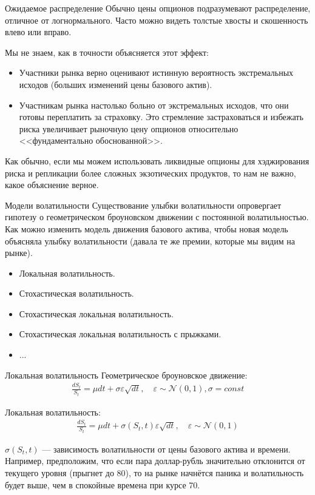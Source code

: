 \documentclass{beamer}
\begin{document}
\begin{frame}{Ожидаемое распределение}
\justify
Обычно цены опционов подразумевают распределение, отличное от логнормального. Часто можно видеть толстые хвосты и скошенность влево или вправо.

\justify
Мы не знаем, как в точности объясняется этот эффект:
\begin{itemize}
\item Участники рынка верно оценивают истинную вероятность экстремальных исходов (больших изменений цены базового актив).
\item Участникам рынка настолько больно от экстремальных исходов, что они готовы переплатить за страховку. Это стремление застраховаться и избежать риска увеличивает рыночную цену опционов относительно <<фундаментально обоснованной>>.
\end{itemize}

\justify
Как обычно, если мы можем использовать ликвидные опционы для хэджирования риска и репликации более сложных экзотических продуктов, то нам не важно, какое объяснение верное.
\end{frame}



\begin{frame}{Модели волатильности}
\justify
Существование улыбки волатильности опровергает гипотезу о геометрическом броуновском движении с постоянной волатильностью. Как можно изменить модель движения базового актива, чтобы новая модель объясняла улыбку волатильности (давала те же премии, которые мы видим на рынке).

\justify
\begin{itemize}
\item Локальная волатильность.
\item Стохастическая волатильность.
\item Стохастическая локальная волатильность.
\item Стохастическая локальная волатильность с прыжками.
\item ...
\end{itemize}
\end{frame}



\begin{frame}{Локальная волатильность}
\justify
Геометрическое броуновское движение:
\begin{align*}
\frac{dS_t}{S_t} = \mu dt + \sigma\varepsilon\sqrt{dt}, \quad \varepsilon \sim \mathcal{N}(0, 1), \sigma = const
\end{align*}

\justify
Локальная волатильность:
\begin{align*}
\frac{dS_t}{S_t} = \mu dt + \sigma(S_t, t)\varepsilon\sqrt{dt}, \quad \varepsilon \sim \mathcal{N}(0, 1)
\end{align*}

\justify
$\sigma(S_t, t)$ --- зависимость волатильности от цены базового актива и времени. Например, предположим, что если пара доллар-рубль значительно отклонится от текущего уровня (прыгнет до 80), то на рынке начнётся паника и волатильность будет выше, чем в спокойные времена при курсе 70.
\end{frame}
\end{document}
